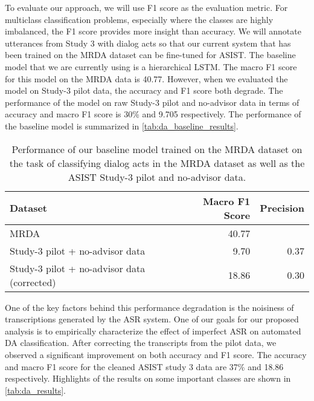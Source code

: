 To evaluate our approach, we will use F1 score as the evaluation metric. For
multiclass classification problems, especially where the classes are highly
imbalanced, the F1 score provides more insight than accuracy. We will annotate
utterances from Study 3 with dialog acts so that our current system that has
been trained on the MRDA dataset can be fine-tuned for ASIST.  The baseline
model that we are currently using is a hierarchical LSTM. The macro F1 score
for this model on the MRDA data is 40.77.  However, when we evaluated the model
on Study-3 pilot data, the accuracy and F1 score both degrade. The performance
of the model on raw Study-3 pilot and no-advisor data in terms of accuracy and
macro F1 score is 30\% and 9.705 respectively. The performance of the baseline
model is summarized in \autoref{tab:da_baseline_results}.

\begin{table}
    \begin{tabular}{lrr}
        \toprule
        Dataset                                     & Macro F1 Score & Precision \\\midrule
        MRDA                                        & 40.77          & \\
        Study-3 pilot + no-advisor data             & 9.70          & 0.37 \\
        Study-3 pilot + no-advisor data (corrected) & 18.86          & 0.30 \\
        \bottomrule
    \end{tabular}
    \caption{%
        Performance of our baseline model trained on the MRDA dataset on the
        task of classifying dialog acts in the MRDA dataset as well as the
        ASIST Study-3 pilot and no-advisor data.
    }
    \label{tab:da_baseline_results}
\end{table}

One of the key factors behind this performance degradation is the noisiness of
transcriptions generated by the ASR system. One of our goals for our proposed
analysis is to empirically characterize the effect of imperfect ASR on
automated DA classification.  After correcting the transcripts from the pilot
data, we observed a significant improvement on both accuracy and F1 score. The
accuracy and macro F1 score for the cleaned ASIST study 3 data are 37\% and
18.86 respectively. Highlights of the results on some important classes are
shown in \autoref{tab:da_results}.

